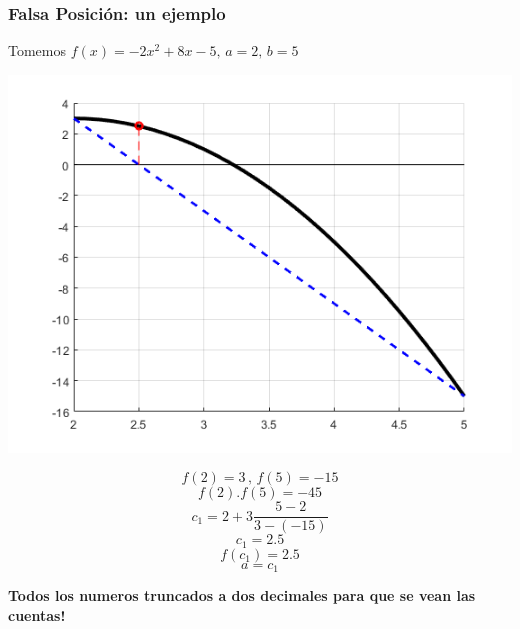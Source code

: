 \documentclass[xcolor=svgnames]{beamer} %
\theoremstyle{plain}
\renewcommand{\textbf}[1]{{\bfseries\textcolor{redUnq2}{#1}}}
\theoremstyle{definition}
\begin{document}
\begin{frame}
\vspace{-5pt}
\frametitle{Falsa Posición: un ejemplo}
Tomemos $f(x) = -2x^2+8x-5, \, a=2, \, b=5$
\begin{minipage}{.7\linewidth}
\includegraphics[scale=.45]{FalsaPosicion/f1.png} 
\end{minipage}
\begin{minipage}{.25\linewidth}
$$f(2)=3 \,,\,f(5)=-15$$
$$f(2).f(5) = -45$$
$$c_1 = 2 +3\frac{5-2}{3-(-15)}$$
$$c_1 = 2.5 $$
$$f(c_1) = 2.5 $$
$$ a = c_1$$\vspace{-5pt}
\end{minipage}\vspace{-5pt}
\textbf{Todos los numeros truncados a dos decimales para que se vean las cuentas!}
\end{frame}
\end{document}
